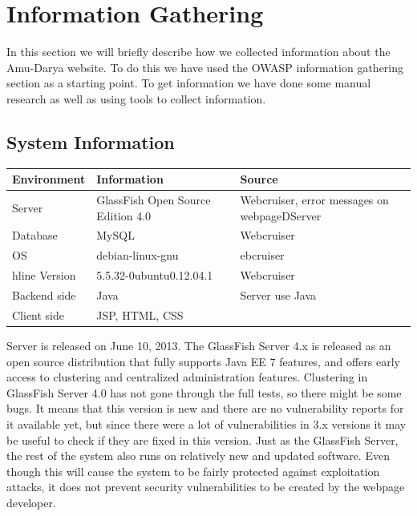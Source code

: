 \clearpage
\section{Information Gathering}

In this section we will briefly describe how we collected information about the Amu-Darya website. To do this we have used the OWASP information gathering section as a starting point. To get information we have done some manual research as well as using tools to collect information.

\subsection{System Information}
\begin{center}
\begin{tabular}{| l | l | p{5cm} |}

\hline
    {\bf Environment} & {\bf Information} & {\bf Source} \\ \hline
    Server & GlassFish Open Source Edition 4.0 & Webcruiser, error messages on webpageDServer \\ \hline
	Database & MySQL & Webcruiser \\ \hline
	OS & debian-linux-gnu & ebcruiser \\ hline
	Version & 5.5.32-0ubuntu0.12.04.1 & Webcruiser \\ \hline
	Backend side & Java & Server use Java \\ \hline
	Client side & JSP, HTML, CSS & \\ \hline
\end{tabular}
\end{center}

\vspace{1cm}

Server is released on June 10, 2013. The GlassFish Server 4.x is released as an open source distribution that fully supports Java EE 7 features, and offers early access to clustering and centralized administration features. Clustering in GlassFish Server 4.0 has not gone through the full tests, so there might be some bugs. It means that this version is new and there are no vulnerability reports for it available yet, but since there were a lot of vulnerabilities in 3.x versions it may be useful to check if they are fixed in this version. Just as the GlassFish Server, the rest of the system also runs on relatively new and updated software. Even though this will cause the system to be fairly protected against exploitation attacks, it does not prevent security vulnerabilities to be created by the webpage developer.

